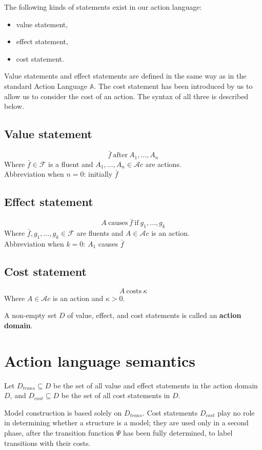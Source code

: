 \documentclass[11pt]{article}
\newcommand{\fluents}{\mathcal{F}}
\newcommand{\actions}{\mathcal{A}c}
\begin{document}
The following kinds of statements exist in our action language:
\begin{itemize}
    \item value statement,
    \item effect statement,
    \item cost statement.
\end{itemize}
Value statements and effect statements are defined in the same way as in the standard Action Language $\mathbb{A}$.
The cost statement has been introduced by us to allow us to consider the cost of an action.
The syntax of all three is described below.

\subsection{Value statement}
\[\bar{f} ~\text{after}~ A_1, \ldots, A_n\]
Where \(\bar{f}\in \fluents\) is a fluent and \(A_1, \ldots, A_n \in \actions\) are actions.\\
Abbreviation when \(n=0\): initially \(\bar{f}\)

\subsection{Effect statement}
\[A ~\text{causes}~ \bar{f} ~\text{if}~ g_1 ,\ldots, g_k\]
Where \(\bar{f},g_1,\ldots,g_k \in \fluents\) are fluents and \(A\in \actions\) is an action.\\
Abbreviation when \(k=0\): \(A_1\) causes \(\bar{f}\)

\subsection{Cost statement}
\[A ~\text{costs}~ \kappa\]
Where \(A\in \actions\) is an action and \(\kappa>0\).

A non-empty set \(D\) of value, effect, and cost statements is called an \textbf{action domain}.

\section{Action language semantics}

Let \(D_{trans} \subseteq D\) be the set of all value and effect statements in the action domain \(D\), and
\(D_{cost} \subseteq D\) be the set of all cost statements in \(D\).


Model construction is based solely on \(D_{trans}\).
Cost statements \(D_{cost}\) play no role in determining whether a structure is a model;
they are used only in a second phase, after the transition function \(\Psi\) has been
fully determined, to label transitions with their costs.
\end{document}
